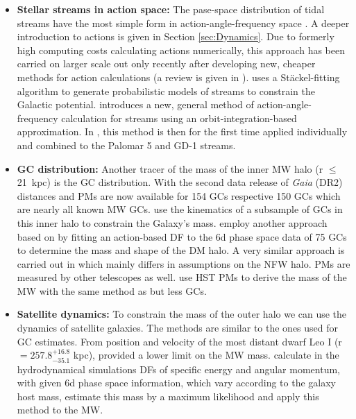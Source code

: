 \begin{itemize}
    \item \textbf{Stellar streams in action space:} The pase-space distribution of tidal streams have the most simple form in action-angle-frequency space \citep{Tremaine...streamsactiontheory...1999, Helmi...streamsactionstheory...1999}. A deeper introduction to actions is given in Section \ref{sec:Dynamics}. Due to formerly high computing costs calculating actions numerically, this approach has been carried on larger scale out only recently after developing new, cheaper methods for action calculations (a review is given in \citet{Sanders...actionreview...2016}). \citet{Streams...Sanders...2014} uses a St\"ackel-fitting algorithm \citep{Sanders...Staeckel...2012} to generate probabilistic models of streams to constrain the Galactic potential. \citet{Streams...Bovy...2014} introduces a new, general method of action-angle-frequency calculation for streams using an orbit-integration-based approximation. In \citet{Streams..GD1..Pal5...Bovy...2016}, this method is then for the first time applied individually and combined to the Palomar 5 and GD-1 streams.
    \item \textbf{\ac{GC} distribution:} Another tracer of the mass of the inner \ac{MW} halo (r $\le$ \SI{21}{kpc}) is the \ac{GC} distribution. With the second data release of \textit{Gaia} (DR2) distances and \acp{PM} are now available for 154 \acp{GC} \citep{Baumgardt...GCoverview...2019} respective 150 \acp{GC} \citep{Vasiliev...GCoverview...2018} which are nearly all known \ac{MW} \acp{GC}. 
    \citet{MWmass...GCmotions...Watkins...2018} use the kinematics of a subsample of \acp{GC} in this inner halo to constrain the Galaxy's mass. \citet{Posti...MWmassGCs...2018} employ another approach based on \citet{Binney...MWGCModel....2017} by fitting an action-based \ac{DF} to the 6d phase space data of 75 \acp{GC} to determine the mass and shape of the \ac{DM} halo. A very similar approach is carried out in \citet{Vasiliev...GCoverview...2018} which mainly differs in assumptions on the \ac{NFW} halo. \acp{PM} are measured by other telescopes as well. \citet{Sohn...GCsHST..2018} use \ac{HST} \acp{PM} to derive the mass of the \ac{MW} with the same method as \citet{MWmass...GCmotions...Watkins...2018} but less \acp{GC}. 

    \item \textbf{Satellite dynamics:} To constrain the mass of the outer halo we can use the dynamics of satellite galaxies. The methods are similar to the ones used for \ac{GC} estimates. From position and velocity of the most distant dwarf Leo I (r $= 257.8_{{-35.1}}^{+16.8} $ kpc), \citet{GaiaDR...GCs...2018} provided a lower limit on the \ac{MW} mass. \citet{MWmass...sat...dyn} calculate in the hydrodynamical simulations \acp{DF} of specific energy and angular momentum, with given 6d phase space information, which vary according to the galaxy host mass, estimate this mass by a maximum likelihood and apply this method to the \ac{MW}.
\end{itemize}


